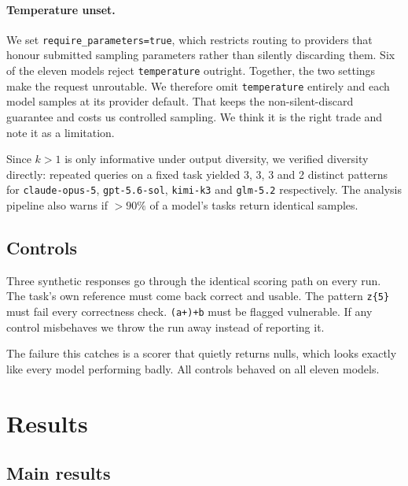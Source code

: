 \documentclass[11pt]{article}
\begin{document}
\paragraph{Temperature unset.} We set
\texttt{require\_parameters=true}, which restricts routing to providers that
honour submitted sampling parameters rather than silently discarding them.
Six of the eleven models reject \texttt{temperature} outright. Together, the
two settings make the request unroutable. We therefore omit \texttt{temperature} entirely and
each model samples at its provider default. That keeps the non-silent-discard guarantee and costs us controlled
sampling. We think it is the right trade and note it as a limitation.

Since $k>1$ is only informative under output diversity, we verified diversity
directly: repeated queries on a fixed task yielded 3, 3, 3 and 2 distinct
patterns for \texttt{claude-opus-5}, \texttt{gpt-5.6-sol}, \texttt{kimi-k3}
and \texttt{glm-5.2} respectively. The analysis pipeline also warns
if $>90\%$ of a model's tasks return identical samples.

\subsection{Controls}

Three synthetic responses go through the identical scoring path on every run.
The task's own reference must come back correct and usable. The pattern
\texttt{z\{5\}} must fail every correctness check. \texttt{(a+)+b} must be
flagged vulnerable. If any control misbehaves we throw the run away instead of
reporting it.

The failure this catches is a scorer that quietly returns nulls, which looks
exactly like every model performing badly. All controls behaved on all eleven
models.

\section{Results}
\label{sec:results}

\subsection{Main results}
\end{document}
